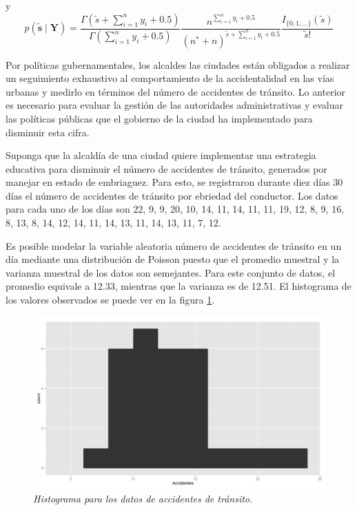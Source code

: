     y
    \begin{equation}\label{pred1_posson_Jeffreys}
    p(\tilde{\mathbf{s}} \mid \mathbf{Y})=\frac{\Gamma(\tilde{s}+\sum_{i=1}^ny_i+0.5)}{\Gamma(\sum_{i=1}^ny_i+0.5)}
    \frac{n^{\sum_{i=1}^ny_i+0.5}}{({n^*}+n)^{\tilde{s}+\sum_{i=1}^ny_i+0.5}}\frac{I_{\{0,1,\ldots\}}(\tilde{s})}{\tilde{s}!}
    \end{equation}
    
    \begin{Eje}\label{Datos_Poisson}
    Por pol\'iticas gubernamentales, los alcaldes las ciudades est\'an obligados a realizar un seguimiento exhaustivo al comportamiento de la accidentalidad en las v\'ias urbanas y medirlo en t\'erminos del n\'umero de accidentes de tr\'ansito. Lo anterior es necesario para evaluar la gesti\'on de las autoridades administrativas y evaluar las pol\'iticas p\'ublicas que el gobierno de la ciudad ha implementado para disminuir esta cifra.
    
    Suponga que la alcald\'ia de una ciudad quiere implementar una estrategia educativa para disminuir el n\'umero de accidentes de tr\'ansito, generados por manejar en estado de embriaguez. Para esto, se registraron durante diez d\'ias 30 d\'ias el n\'umero de accidentes de tr\'ansito por ebriedad del conductor. Los datos para cada uno de los d\'ias son 22, 9, 9, 20, 10, 14, 11, 14, 11, 11, 19, 12, 8, 9, 16, 8, 13, 8, 14, 12, 14, 11, 14, 13, 11, 14, 13, 11, 7, 12.
    
    Es posible modelar la variable aleatoria n\'umero de accidentes de tr\'ansito en un d\'ia mediante una distribuci\'on de Poisson puesto que el promedio muestral y la varianza muestral de los datos son semejantes. Para este conjunto de datos, el promedio equivale a 12.33, mientras que la varianza es de 12.51. El histograma de los valores observados se puede ver en la figura \ref{EjemPoisson1}.
    
    \begin{figure}[!h]
    \centering
    \includegraphics[scale=0.5]{EjemPoisson1.pdf}
    \caption{\emph{Histograma para los datos de accidentes de tr\'ansito.}}
    \label{EjemPoisson1}
    \end{figure}
    

\end{Eje}
